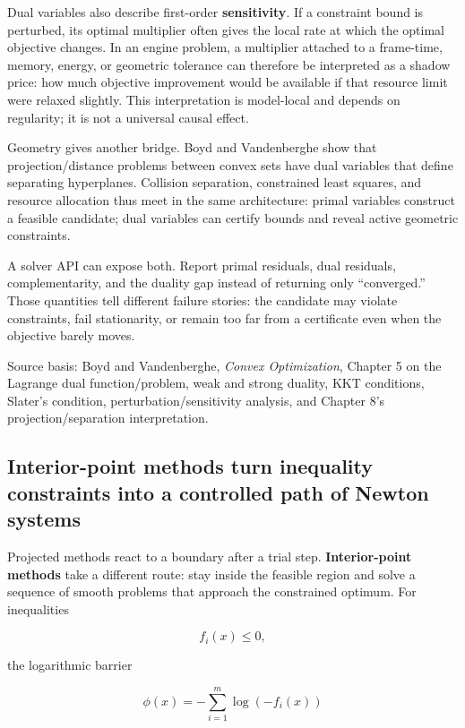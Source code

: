 Dual variables also describe first-order \textbf{sensitivity}. If a constraint bound is perturbed, its optimal multiplier often gives the local rate at which the optimal objective changes. In an engine problem, a multiplier attached to a frame-time, memory, energy, or geometric tolerance can therefore be interpreted as a shadow price: how much objective improvement would be available if that resource limit were relaxed slightly. This interpretation is model-local and depends on regularity; it is not a universal causal effect.

Geometry gives another bridge. Boyd and Vandenberghe show that projection/distance problems between convex sets have dual variables that define separating hyperplanes. Collision separation, constrained least squares, and resource allocation thus meet in the same architecture: primal variables construct a feasible candidate; dual variables can certify bounds and reveal active geometric constraints.

A solver API can expose both. Report primal residuals, dual residuals, complementarity, and the duality gap instead of returning only ``converged.'' Those quantities tell different failure stories: the candidate may violate constraints, fail stationarity, or remain too far from a certificate even when the objective barely moves.

Source basis: Boyd and Vandenberghe, \emph{Convex Optimization}, Chapter 5 on the Lagrange dual function/problem, weak and strong duality, KKT conditions, Slater's condition, perturbation/sensitivity analysis, and Chapter 8's projection/separation interpretation.

\subsection{Interior-point methods turn inequality constraints into a controlled path of Newton systems}\label{02-foundations-ii-ch026-interior-point-methods-turn-inequality-constraints-into-a-controlled-path-of-newton-systems}

Projected methods react to a boundary after a trial step. \textbf{Interior-point methods} take a different route: stay inside the feasible region and solve a sequence of smooth problems that approach the constrained optimum. For inequalities

\[
f_i(x)\le0,
\]

the logarithmic barrier

\[
\phi(x)
=
-\sum_{i=1}^{m}\log(-f_i(x))
\]

